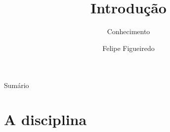 \documentclass{beamer}
\title%
{Introdução}
\subtitle
{Conhecimento} %
\author%
{Felipe Figueiredo}%
\institute[INTO] %
{Instituto Nacional de Traumatologia e Ortopedia
}
\date%
{}
\begin{document}
\begin{frame}
  \titlepage
\end{frame}

\begin{frame}{Sumário}
  \tableofcontents
\end{frame}








\section{A disciplina}
\end{document}

